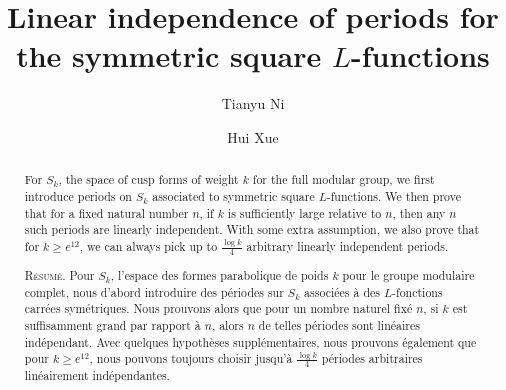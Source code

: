 \documentclass[11pt,letterpaper,reqno]{amsart}
\title{Linear independence of periods for the symmetric square $L$-functions}
\numberwithin{figure}{section}
\numberwithin{table}{section}
\theoremstyle{definition}
\theoremstyle{plain}
\theoremstyle{definition}
\theoremstyle{definition}
\theoremstyle{remark}
\numberwithin{equation}{section}
\theoremstyle{remark}
\begin{document}
\author{Tianyu Ni}
\address{School of Mathematical and Statistical Sciences\\
Clemson University\\
Clemson, SC 29634-0975\\
USA}
\author{Hui Xue}
\address{School of Mathematical and Statistical Sciences\\
Clemson University\\
Clemson, SC 29634-0975\\
USA}
\begin{abstract} For $S_k$, the space of cusp forms of weight $k$ for the full modular group, we first introduce periods on $S_k$ associated to symmetric square $L$-functions. We then prove that for a fixed natural number $n$, if $k$ is sufficiently large relative to $n$, then any $n$ such periods are linearly independent. With some extra assumption, we also prove that for $k\geq e^{12}$, we can always pick up to $\frac{\log k}{4}$ arbitrary linearly independent periods.

\medskip

\noindent\textsc{R\'esum\'e.}
Pour $S_k$, l’espace des formes parabolique de poids $k$ pour le groupe modulaire complet, nous d’abord
introduire des p\'eriodes sur $S_k$ associ\'ees \`a des $L$-fonctions  carr\'ees sym\'etriques. Nous prouvons alors que pour un
nombre naturel fix\'e $n$, si $k$ est suffisamment grand par rapport \`a $n$, alors $n$ de telles p\'eriodes sont lin\'eaires
ind\'ependant. Avec quelques hypoth\`eses suppl\'ementaires, nous prouvons \'egalement que pour $k\ge e^{12}$, nous pouvons toujours choisir
jusqu'\`a  $\frac{\log k}4
$ p\'eriodes arbitraires lin\'eairement indépendantes.


\end{abstract}
\maketitle
\end{document}
